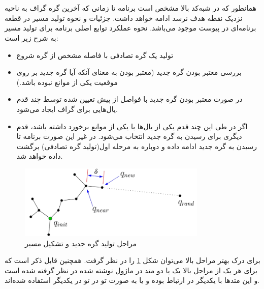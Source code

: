 \section*{}
\begin{latin}
	
\end{latin}

همانطور که در شبه‌کد بالا مشخص است برنامه تا زمانی که آخرین گره گراف به ناحیه نزدیک نقطه هدف نرسد ادامه خواهد داشت. جزئیات و نحوه تولید مسیر در قطعه برنامه‌ای در پیوست موجود می‌باشد. نحوه عملکرد توابع اصلی برنامه برای تولید مسیر به شرح زیر است:
\begin{itemize}
	\item
	تولید یک گره تصادفی با فاصله مشخص از گره شروع
	\item
	بررسی معتبر بودن گره جدید (معتبر بودن به معنای آنکه آیا گره جدید بر روی موقعیت یکی از موانع نبوده باشد.)
	\item
	در صورت معتبر بودن گره جدید با فواصل از پیش تعیین شده توسط چند قدم یال‌هایی برای گراف ایجاد می‌شود.
	\item
	اگر در طی این چند قدم یکی از یال‌ها با یکی از موانع برخورد داشته باشد، قدم دیگری برای رسیدن به گره جدید انتخاب می‌شود. در غیر این صورت برنامه تا رسیدن به گره جدید ادامه داده و دوباره به مرحله اول(تولید گره تصادفی) برگشت داده خواهد شد.
\end{itemize}

\begin{figure}[H]
	\centering
	\includegraphics[width=0.8\textwidth]{./images/Chapter2/NewNodeSteps_without_background}	
	\caption[مراحل تولید گره جدید و تشکیل مسیر]{مراحل تولید گره جدید و تشکیل مسیر\cite{Algobotics}}
	\label{مراحل تولید گره جدید}
\end{figure}
\noindent
\unskip

برای درک بهتر مراحل بالا می‌توان شکل
\ref{مراحل تولید گره جدید}
را در نظر گرفت. همچنین قابل ذکر است که برای هر یک از مراحل بالا یک یا دو متد
\noindent\unskip{}
در ماژول نوشته شده در نظر گرفته شده است و این متد‌ها با یکدیگر در ارتباط بوده و یا به صورت تو در تو
 \noindent\unskip{}
در یکدیگر استفاده شده‌اند. 

